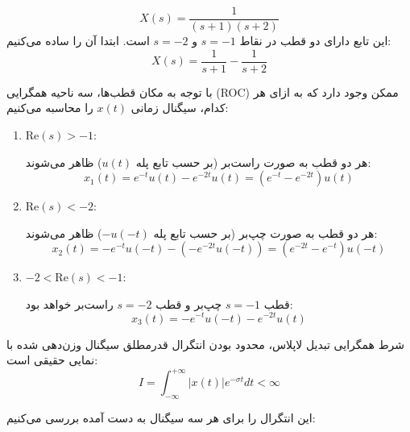 \[
X(s) = \frac{1}{(s + 1)(s + 2)}
\]
این تابع دارای دو قطب در نقاط $s = -1$ و $s = -2$ است. ابتدا آن را ساده می‌کنیم:
\[
X(s) = \frac{1}{s + 1} - \frac{1}{s + 2}
\]

با توجه به مکان قطب‌ها، سه ناحیه همگرایی (ROC) ممکن وجود دارد که به ازای هر کدام، سیگنال زمانی $x(t)$ را محاسبه می‌کنیم:

\begin{enumerate}
    \item $\text{Re}(s) > -1:$

    هر دو قطب به صورت راست‌بر (بر حسب تابع پله $u(t)$) ظاهر می‌شوند:
    \[
    x_1(t) = e^{-t} u(t) - e^{-2t} u(t) = \left( e^{-t} - e^{-2t} \right) u(t)
    \]

    \item $\text{Re}(s) < -2:$

    هر دو قطب به صورت چپ‌بر (بر حسب تابع پله $-u(-t)$) ظاهر می‌شوند:
    \[
    x_2(t) = -e^{-t} u(-t) - \left( -e^{-2t} u(-t) \right) = \left( e^{-2t} - e^{-t} \right) u(-t)
    \]

    \item $-2 < \text{Re}(s) < -1:$

    قطب $s = -1$ چپ‌بر و قطب $s = -2$ راست‌بر خواهد بود:
    \[
    x_3(t) = -e^{-t} u(-t) - e^{-2t} u(t)
    \]
\end{enumerate}



شرط همگرایی تبدیل لاپلاس، محدود بودن انتگرال قدرمطلق سیگنال وزن‌دهی شده با نمایی حقیقی است:
\[
I = \int_{-\infty}^{+\infty} |x(t)| e^{-\sigma t} dt < \infty
\]

این انتگرال را برای هر سه سیگنال به دست آمده بررسی می‌کنیم:

